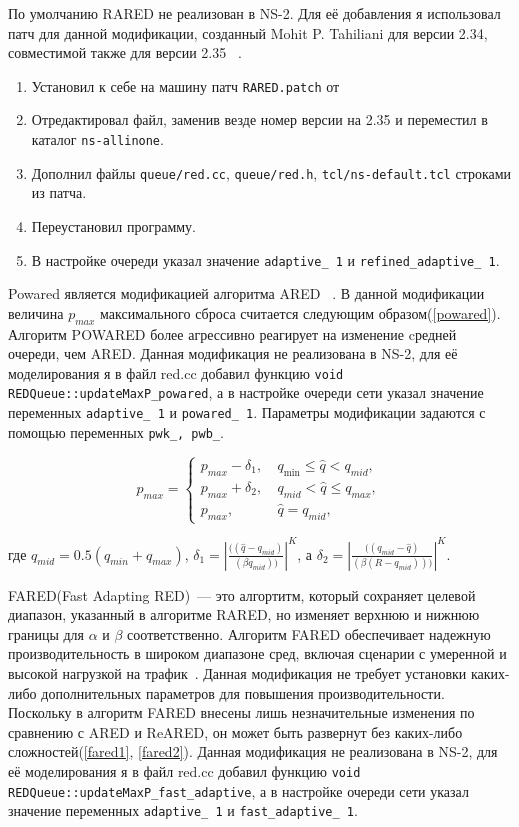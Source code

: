 По умолчанию RARED не реализован в NS-2. Для её добавления я использовал патч для данной модификации, созданный Mohit
  P. Tahiliani для версии 2.34, совместимой также для версии 2.35 ~\cite{refinedpatch}. 

\begin{enumerate}
\item Установил к себе на машину патч \verb|RARED.patch| от 
\item Отредактировал файл, заменив везде номер версии на 2.35 и переместил в каталог \verb|ns-allinone|.
\item Дополнил файлы \verb|queue/red.cc|, \verb|queue/red.h|, \verb|tcl/ns-default.tcl| строками из патча.
\item Переустановил программу.
\item В настройке очереди указал значение \verb|adaptive_ 1| и 
\verb|refined_adaptive_ 1|.
\end{enumerate}
 
 
Powared является модификацией алгоритма ARED ~\cite{Powared}. В данной модификации величина $p_{max}$ максимального сброса считается следующим образом(\eqref{powared}). Алгоритм POWARED более агрессивно реагирует на изменение cредней очереди, чем ARED. Данная модификация не реализована в NS-2, для её моделирования я в файл red.cc добавил функцию \verb|void REDQueue::updateMaxP_powared|, а в настройке очереди сети указал значение переменных \verb|adaptive_ 1| и \verb|powared_ 1|. 
Параметры модификации задаются с помощью переменных \verb|pwk_, pwb_|.

\begin{equation}
\label{powared}
p_{max} =\begin{cases}
        p_{max}-\delta_1, &  \  q_{\min} \leqslant \hat{q} < q_{mid}, 
        \\
        p_{max}+\delta_2, & \ q_{mid} < \hat{q}  \leqslant q_{max}, 
        \\
        p_{max}, &  \ \hat{q} =  q_{mid},
\end{cases}
\end{equation}

где $q_{mid} = 0.5(q_{min} + q_{max})$, 
$\delta_1 = |\frac{((\hat{q} - q_{mid})}{(\beta q_{mid}))}|^K $, а $\delta_2 = |\frac{((q_{mid} - \hat{q})}{(\beta (R -q_{mid})))}|^K.$


FARED(Fast Adapting RED)~--- это алгортитм, который сохраняет целевой диапазон, указанный в алгоритме RARED, но изменяет верхнюю и нижнюю границы для $\alpha $ и $\beta$ соответственно. Алгоритм FARED обеспечивает надежную производительность в широком диапазоне сред, включая сценарии с умеренной и высокой нагрузкой на трафик~\cite{Tahiliani_2012}.
Данная модификация не требует установки каких-либо дополнительных параметров для повышения производительности. Поскольку в алгоритм FARED внесены лишь незначительные изменения по сравнению
с ARED и ReARED, он может быть развернут без каких-либо сложностей(\eqref{fared1}, \eqref{fared2}). Данная модификация не реализована в NS-2, для её моделирования я в файл red.cc добавил функцию \verb|void REDQueue::updateMaxP_fast_adaptive|, а в настройке очереди сети указал значение переменных \verb|adaptive_ 1| 
и \verb|fast_adaptive_ 1|. 

